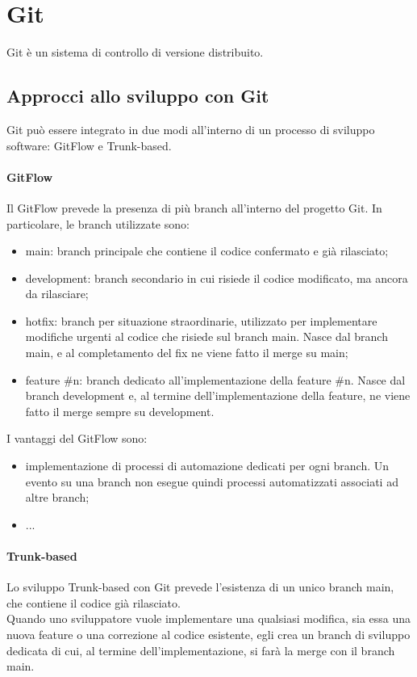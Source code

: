 \chapter{Git}
Git è un sistema di controllo di versione distribuito.

\section{Approcci allo sviluppo con Git}
Git può essere integrato in due modi all'interno di un processo di sviluppo software: GitFlow e Trunk-based.
\subsubsection{GitFlow}
Il GitFlow prevede la presenza di più branch all'interno del progetto Git. In particolare, le branch utilizzate sono:
\begin{itemize}
    \item main: branch principale che contiene il codice confermato e già rilasciato;
    \item development: branch secondario in cui risiede il codice modificato, ma ancora da rilasciare;
    \item hotfix: branch per situazione straordinarie, utilizzato per implementare modifiche urgenti al codice che risiede sul branch main. Nasce dal branch main, e al completamento del fix ne viene fatto il merge su main;
    \item feature \#n: branch dedicato all'implementazione della feature \#n. Nasce dal branch development e, al termine dell'implementazione della feature, ne viene fatto il merge sempre su development.
\end{itemize}

I vantaggi del GitFlow sono:
\begin{itemize}
    \item implementazione di processi di automazione dedicati per ogni branch. Un evento su una branch non esegue quindi processi automatizzati associati ad altre branch;
    \item ...
\end{itemize}

\subsubsection{Trunk-based}
Lo sviluppo Trunk-based con Git prevede l'esistenza di un unico branch main, che contiene il codice già rilasciato.\\
Quando uno sviluppatore vuole implementare una qualsiasi modifica, sia essa una nuova feature o una correzione al codice esistente, egli crea un branch di sviluppo dedicata di cui, al termine dell'implementazione, si farà la merge con il branch main.

